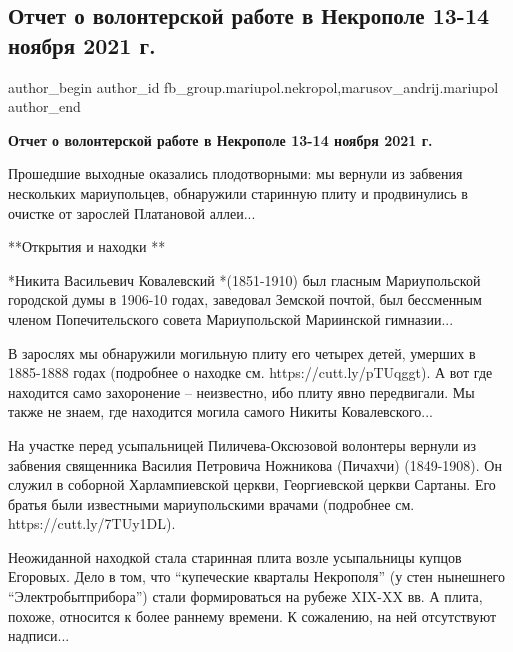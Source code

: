  
 
 
 
 

\subsection{Отчет о волонтерской работе в Некрополе 13-14 ноября 2021 г.}
\label{sec:20_11_2021.fb.fb_group.mariupol.nekropol.1.otchet_volonter_rabota_13_14_nojabrja}
 
\ifcmt
 author_begin
   author_id fb_group.mariupol.nekropol,marusov_andrij.mariupol
 author_end
\fi

\textbf{Отчет о волонтерской работе в Некрополе 13-14 ноября 2021 г.}

Прошедшие выходные оказались плодотворными: мы вернули из забвения нескольких
мариупольцев, обнаружили старинную плиту и продвинулись в очистке от зарослей
Платановой аллеи...

**Открытия и находки **

*Никита Васильевич Ковалевский *(1851-1910) был гласным Мариупольской городской
думы в 1906-10 годах, заведовал Земской почтой, был бессменным членом
Попечительского совета Мариупольской Мариинской гимназии...

В зарослях мы обнаружили могильную плиту его четырех детей, умерших в 1885-1888
годах (подробнее о находке см. https://cutt.ly/pTUqggt). А вот где находится
само захоронение – неизвестно, ибо плиту явно передвигали. Мы также не знаем,
где находится могила самого Никиты Ковалевского...

На участке перед усыпальницей Пиличева-Оксюзовой волонтеры вернули из забвения
священника Василия Петровича Ножникова (Пичахчи) (1849-1908). Он служил в
соборной Харлампиевской церкви, Георгиевской церкви Сартаны. Его братья были
известными мариупольскими врачами (подробнее см. https://cutt.ly/7TUy1DL).

Неожиданной находкой стала старинная плита возле усыпальницы купцов Егоровых.
Дело в том, что \enquote{купеческие кварталы Некрополя} (у стен нынешнего
\enquote{Электробытприбора}) стали формироваться на рубеже XIX-XX вв. А плита, похоже,
относится к более раннему времени. К сожалению, на ней отсутствуют надписи...

